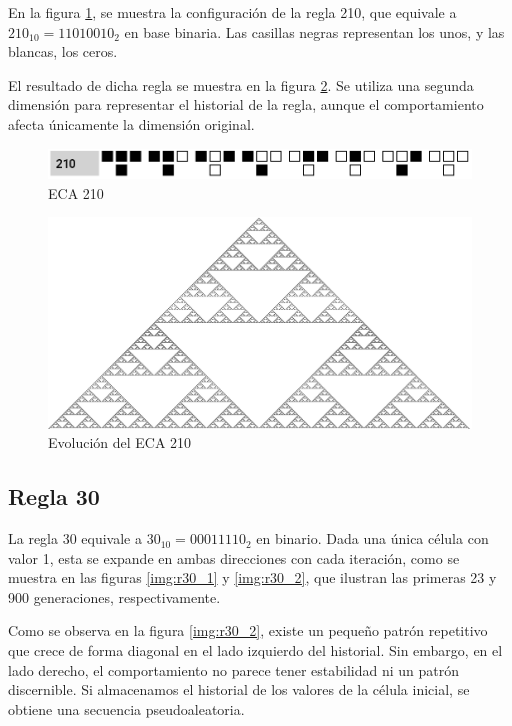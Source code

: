 \documentclass[12pt,twoside]{article}
\begin{document}
	En la figura \ref{img:eca1}, se muestra la configuración de la regla 210, que equivale a $210_{10} = 11010010_2$ en base binaria. Las casillas negras representan los unos, y las blancas, los ceros.
	
	El resultado de dicha regla se muestra en la figura \ref{img:eca2}. Se utiliza una segunda dimensión para representar el historial de la regla, aunque el comportamiento afecta únicamente la dimensión original.
	
	\begin{figure}[H]
		\centering
		\includegraphics[width=\textwidth]{img/eca1.png}
		\caption{ECA 210}
		\label{img:eca1}
	\end{figure}
	
	\begin{figure}[H]
		\centering
		\includegraphics[width=\textwidth]{img/eca2.png}
		\caption{Evolución del ECA 210}
		\label{img:eca2}
	\end{figure}
	
	\subsection{Regla 30}
	
	La regla 30 equivale a $30_{10}=00011110_2$ en binario. Dada una única célula con valor 1, esta se expande en ambas direcciones con cada iteración, como se muestra en las figuras \ref{img:r30_1} y \ref{img:r30_2}, que ilustran las primeras 23 y 900 generaciones, respectivamente.
	
	Como se observa en la figura \ref{img:r30_2}, existe un pequeño patrón repetitivo que crece de forma diagonal en el lado izquierdo del historial. Sin embargo, en el lado derecho, el comportamiento no parece tener estabilidad ni un patrón discernible. Si almacenamos el historial de los valores de la célula inicial, se obtiene una secuencia pseudoaleatoria.
	
\end{document}

